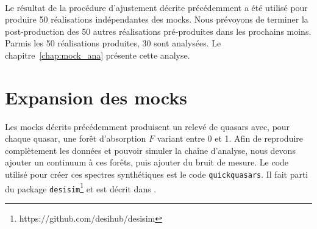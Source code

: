 \paragraph{}
Le résultat de la procédure d'ajustement décrite précédemment a été utilisé pour produire \num{50} réalisations indépendantes des mocks. Nous prévoyons de terminer la post-production des \num{50} autres réalisations pré-produites dans les prochains moins.
  Parmis les \num{50} réalisations produites, \num{30} sont analysées. Le chapitre~\ref{chap:mock_ana} présente cette analyse.


\section{Expansion des mocks}
\label{sec:quickquasars}

Les mocks décrits précédemment produisent un relevé de quasars avec, pour chaque quasar, une forêt d'absorption $F$ variant entre 0 et 1.
Afin de reproduire complètement les données et pouvoir simuler la chaîne d'analyse, nous devons ajouter un continuum à ces forêts, puis ajouter du bruit de mesure.
Le code utilisé pour créer ces spectres synthétiques est le code \texttt{quickquasars}. Il fait parti du package \texttt{desisim}\footnote{https://github.com/desihub/desisim} et est décrit dans \textcite{Gonzalez-Morales}. 

